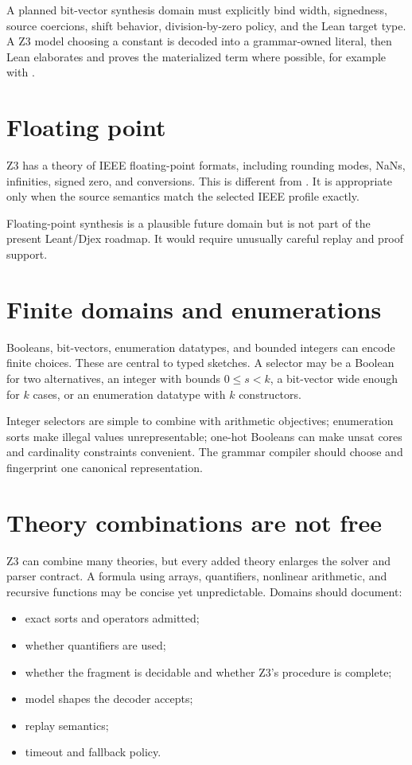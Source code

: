 \documentclass[10pt,letterpaper,oneside]{report}
\newcommand{\code}[1]{\texttt{\detokenize{#1}}}
\begin{document}
A planned bit-vector synthesis domain must explicitly bind width, signedness, source coercions, shift behavior, division-by-zero policy, and the Lean target type. A Z3 model choosing a constant is decoded into a grammar-owned literal, then Lean elaborates and proves the materialized term where possible, for example with \code{bv_decide}.

\section{Floating point}

Z3 has a theory of IEEE floating-point formats, including rounding modes, NaNs, infinities, signed zero, and conversions. This is different from \code{Real}. It is appropriate only when the source semantics match the selected IEEE profile exactly.

Floating-point synthesis is a plausible future domain but is not part of the present Leant/Djex roadmap. It would require unusually careful replay and proof support.

\section{Finite domains and enumerations}

Booleans, bit-vectors, enumeration datatypes, and bounded integers can encode finite choices. These are central to typed sketches. A selector may be a Boolean for two alternatives, an integer with bounds $0\le s<k$, a bit-vector wide enough for $k$ cases, or an enumeration datatype with $k$ constructors.

Integer selectors are simple to combine with arithmetic objectives; enumeration sorts make illegal values unrepresentable; one-hot Booleans can make unsat cores and cardinality constraints convenient. The grammar compiler should choose and fingerprint one canonical representation.

\section{Theory combinations are not free}

Z3 can combine many theories, but every added theory enlarges the solver and parser contract. A formula using arrays, quantifiers, nonlinear arithmetic, and recursive functions may be concise yet unpredictable. Domains should document:

\begin{itemize}
\item exact sorts and operators admitted;
\item whether quantifiers are used;
\item whether the fragment is decidable and whether Z3's procedure is complete;
\item model shapes the decoder accepts;
\item replay semantics;
\item timeout and fallback policy.
\end{itemize}
\end{document}
